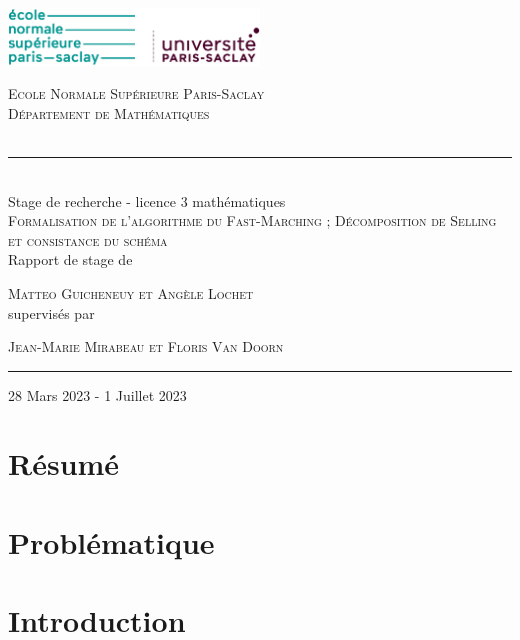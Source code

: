 \documentclass[12pt]{article}
\numberwithin{equation}{section}
\begin{document}
\begin{center}
    \includegraphics[width=0.5\textwidth]{ENSPS_UPSAY_logo_couleur_2.png}
\end{center}

\begin{center}
    \vspace{30pt}
    \Large\textsc{Ecole Normale Supérieure Paris-Saclay}
    \\
    \large\textsc{Département de Mathématiques}
    \\
    \textsc{}
    \\
    \rule{200pt}{0.5pt}
    \\
    \vspace{10pt}
    {Stage de recherche - licence 3 mathématiques}
    \\
    \vspace{50pt}
    \LARGE\textsc{Formalisation de l'algorithme du Fast-Marching ; Décomposition de Selling et consistance du schéma}
    \\
    \vspace{40pt}
    \large{Rapport de stage de}

    \Large\textsc{Matteo Guicheneuy et Angèle Lochet}
    \\
    \large{supervisés par}

    \Large\textsc{Jean-Marie Mirabeau et Floris Van Doorn}

    \vspace{40pt}
    \rule{200pt}{0.5pt}

    \vspace{10pt}
    \large{28 Mars 2023 - 1 Juillet 2023}
\end{center}
\thispagestyle{empty}
\newpage

\tableofcontents
\setcounter{page}{1}



\newpage
\section*{Résumé}

\section{Problématique}

\section{Introduction}
\end{document}
